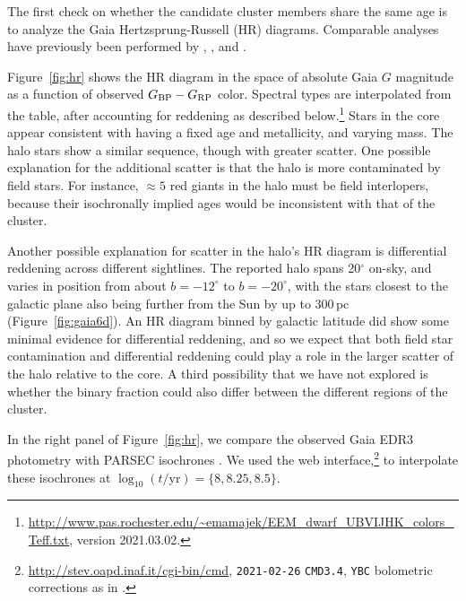 \documentclass[12pt,twocolumn,tighten]{aastex63}
\newcommand{\bpmrp}{G_{\rm BP}-G_{\rm RP}}
\begin{document}
The first check on whether the candidate cluster members share the
same age is to analyze the Gaia Hertzsprung-Russell (HR) diagrams.
Comparable analyses have previously been performed by
,
, and .

Figure~\ref{fig:hr} shows the HR diagram in the space of absolute Gaia
$G$ magnitude as a function of observed $\bpmrp$ color.  Spectral
types are interpolated from the \citet{pecaut_mamajek_2013} table,
after accounting for reddening as described
below.\footnote{\url{http://www.pas.rochester.edu/~emamajek/EEM_dwarf_UBVIJHK_colors_Teff.txt},
version 2021.03.02.} Stars in the core appear consistent with having a
fixed age and metallicity, and varying mass.  The halo stars show a
similar sequence, though with greater scatter.  One possible
explanation for the additional scatter is that the halo is more
contaminated by field stars.  For instance, $\approx5$ red giants in
the halo must be field interlopers, because their isochronally implied
ages would be inconsistent with that of the cluster.

Another possible explanation for scatter in the halo's HR diagram
is differential reddening across different sightlines.  The
reported halo spans 20$^\circ$ on-sky, and varies in position from
about $b=-12^\circ$ to $b=-20^\circ$, with the stars closest to the
galactic plane also being further from the Sun by up to 300\,pc
(Figure~\ref{fig:gaia6d}).  An HR diagram binned by galactic latitude
did show some minimal evidence for differential reddening, and so we
expect that both field star contamination and differential reddening
could play a role in the larger scatter of the halo relative to the
core.  A third possibility that we have not explored is whether the
binary fraction could also differ between the different regions of the
cluster.

In the right panel of Figure~\ref{fig:hr}, we compare the observed
Gaia EDR3 photometry with PARSEC isochrones
\citep{bressan_parsec_2012,chen_improving_2014,chen_parsec_2015,marigo_new_2017}.
We used the web
interface,\footnote{\url{http://stev.oapd.inaf.it/cgi-bin/cmd},
\texttt{2021-02-26} \texttt{CMD3.4}, \texttt{YBC} bolometric
corrections as in \citet{chen_2019_YBC}.} to interpolate these
isochrones at $\log_{10}(t/\mathrm{yr})=\{8, 8.25, 8.5\}$.
\end{document}
